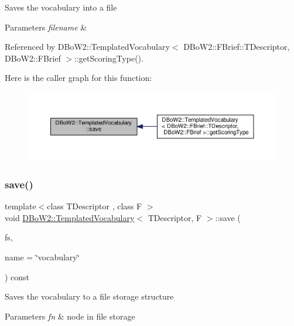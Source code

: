 Saves the vocabulary into a file 
\begin{DoxyParams}{Parameters}
{\em filename} & \\
\hline
\end{DoxyParams}


Referenced by D\+Bo\+W2\+::\+Templated\+Vocabulary$<$ D\+Bo\+W2\+::\+F\+Brief\+::\+T\+Descriptor, D\+Bo\+W2\+::\+F\+Brief $>$\+::get\+Scoring\+Type().

Here is the caller graph for this function\+:\nopagebreak
\begin{figure}[H]
\begin{center}
\leavevmode
\includegraphics[width=350pt]{classDBoW2_1_1TemplatedVocabulary_a92ca49bd6600bddbad145fb6e0543fa1_icgraph}
\end{center}
\end{figure}
\mbox{\label{classDBoW2_1_1TemplatedVocabulary_a3039529c46f02b795450f4fba2207339}} 
\subsubsection{\texorpdfstring{save()}{save()}\hspace{0.1cm}{\footnotesize\ttfamily [2/2]}}
{\footnotesize\ttfamily template$<$class T\+Descriptor , class F $>$ \\
void \hyperlink{classDBoW2_1_1TemplatedVocabulary}{D\+Bo\+W2\+::\+Templated\+Vocabulary}$<$ T\+Descriptor, F $>$\+::save (\begin{DoxyParamCaption}\item[{cv\+::\+File\+Storage \&}]{fs,  }\item[{const std\+::string \&}]{name = {\ttfamily \char`\"{}vocabulary\char`\"{}} }\end{DoxyParamCaption}) const\hspace{0.3cm}{\ttfamily [virtual]}}

Saves the vocabulary to a file storage structure 
\begin{DoxyParams}{Parameters}
{\em fn} & node in file storage \\
\hline
\end{DoxyParams}
\mbox{\label{classDBoW2_1_1TemplatedVocabulary_aedde9cc3255e41fd0441055eeb640346}} 
